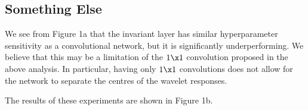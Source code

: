 \subsection{Something Else}
We see from Figure 1a that the invariant layer has similar hyperparameter
sensitivity as a convolutional network, but it is significantly underperforming.
We believe that this may be a limitation of the $1\x 1$ convolution proposed in
the above analysis. In particular, having only $1\x 1$ convolutions does not
allow for the network to separate the centres of the wavelet responses. 


The results of these experiments are shown in Figure 1b.





